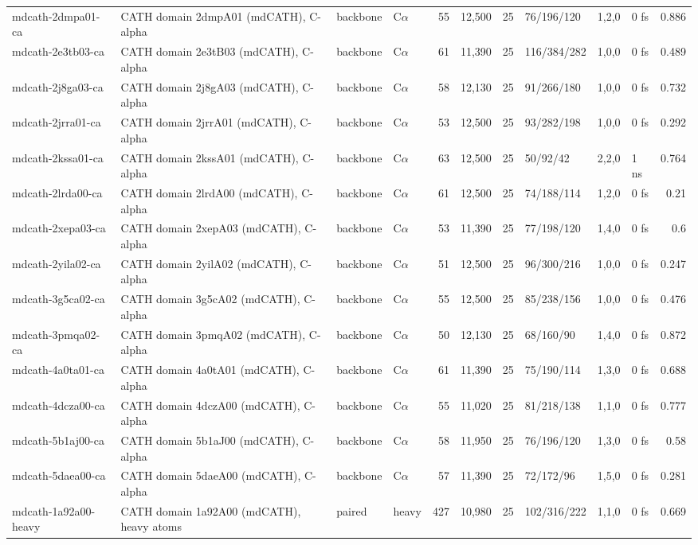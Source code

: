 \documentclass[10pt]{article}
\begin{document}
\begin{small}
\begin{longtable}{p{3.9cm}p{5.2cm}llrrrlrlr}
mdcath-2dmpa01-ca & CATH domain 2dmpA01 (mdCATH), C-alpha & backbone & C$\alpha$ & 55 & 12,500 & 25 & 76/196/120 & 1,2,0 & 0 fs & 0.886\\
mdcath-2e3tb03-ca & CATH domain 2e3tB03 (mdCATH), C-alpha & backbone & C$\alpha$ & 61 & 11,390 & 25 & 116/384/282 & 1,0,0 & 0 fs & 0.489\\
mdcath-2j8ga03-ca & CATH domain 2j8gA03 (mdCATH), C-alpha & backbone & C$\alpha$ & 58 & 12,130 & 25 & 91/266/180 & 1,0,0 & 0 fs & 0.732\\
mdcath-2jrra01-ca & CATH domain 2jrrA01 (mdCATH), C-alpha & backbone & C$\alpha$ & 53 & 12,500 & 25 & 93/282/198 & 1,0,0 & 0 fs & 0.292\\
mdcath-2kssa01-ca & CATH domain 2kssA01 (mdCATH), C-alpha & backbone & C$\alpha$ & 63 & 12,500 & 25 & 50/92/42 & 2,2,0 & 1 ns & 0.764\\
mdcath-2lrda00-ca & CATH domain 2lrdA00 (mdCATH), C-alpha & backbone & C$\alpha$ & 61 & 12,500 & 25 & 74/188/114 & 1,2,0 & 0 fs & 0.21\\
mdcath-2xepa03-ca & CATH domain 2xepA03 (mdCATH), C-alpha & backbone & C$\alpha$ & 53 & 11,390 & 25 & 77/198/120 & 1,4,0 & 0 fs & 0.6\\
mdcath-2yila02-ca & CATH domain 2yilA02 (mdCATH), C-alpha & backbone & C$\alpha$ & 51 & 12,500 & 25 & 96/300/216 & 1,0,0 & 0 fs & 0.247\\
mdcath-3g5ca02-ca & CATH domain 3g5cA02 (mdCATH), C-alpha & backbone & C$\alpha$ & 55 & 12,500 & 25 & 85/238/156 & 1,0,0 & 0 fs & 0.476\\
mdcath-3pmqa02-ca & CATH domain 3pmqA02 (mdCATH), C-alpha & backbone & C$\alpha$ & 50 & 12,130 & 25 & 68/160/90 & 1,4,0 & 0 fs & 0.872\\
mdcath-4a0ta01-ca & CATH domain 4a0tA01 (mdCATH), C-alpha & backbone & C$\alpha$ & 61 & 11,390 & 25 & 75/190/114 & 1,3,0 & 0 fs & 0.688\\
mdcath-4dcza00-ca & CATH domain 4dczA00 (mdCATH), C-alpha & backbone & C$\alpha$ & 55 & 11,020 & 25 & 81/218/138 & 1,1,0 & 0 fs & 0.777\\
mdcath-5b1aj00-ca & CATH domain 5b1aJ00 (mdCATH), C-alpha & backbone & C$\alpha$ & 58 & 11,950 & 25 & 76/196/120 & 1,3,0 & 0 fs & 0.58\\
mdcath-5daea00-ca & CATH domain 5daeA00 (mdCATH), C-alpha & backbone & C$\alpha$ & 57 & 11,390 & 25 & 72/172/96 & 1,5,0 & 0 fs & 0.281\\
mdcath-1a92a00-heavy & CATH domain 1a92A00 (mdCATH), heavy atoms & paired & heavy & 427 & 10,980 & 25 & 102/316/222 & 1,1,0 & 0 fs & 0.669\\

\end{longtable}
\end{small}
\end{document}
